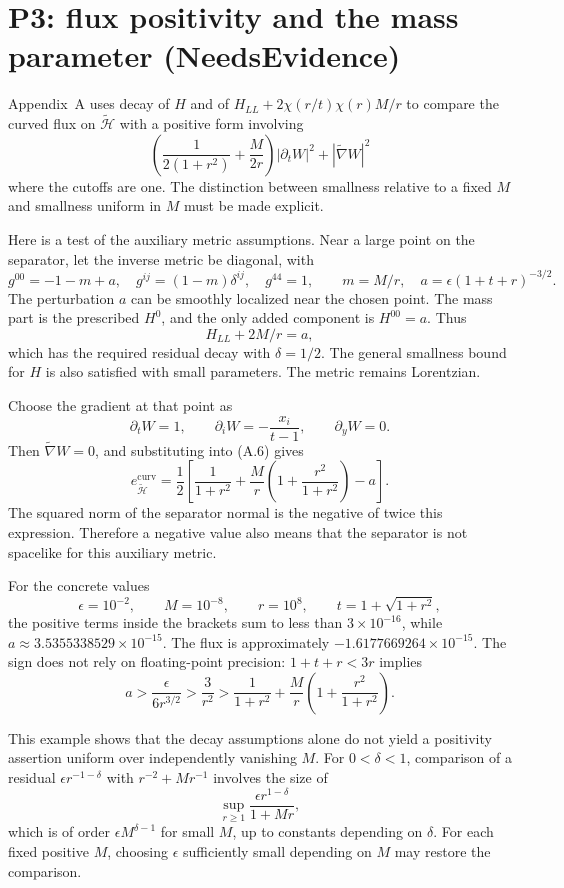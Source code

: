 \documentclass[10pt]{article}
\begin{document}
\section*{P3: flux positivity and the mass parameter (NeedsEvidence)}
Appendix A uses decay of \(H\) and of \(H_{LL}+2\chi(r/t)\chi(r)M/r\) to compare the curved flux on \(\widetilde{\mathcal H}\) with a positive form involving \[\left(\frac{1}{2(1+r^2)}+\frac{M}{2r}\right)|\partial_tW|^2
       +|\widetilde\nabla W|^2\] where the cutoffs are one. The distinction between smallness relative to a fixed \(M\) and smallness uniform in \(M\) must be made explicit.\par
Here is a test of the auxiliary metric assumptions. Near a large point on the separator, let the inverse metric be diagonal, with \[g^{00}=-1-m+a,\quad g^{ij}=(1-m)\delta^{ij},\quad g^{44}=1,
 \qquad m=M/r,\quad a=\epsilon(1+t+r)^{-3/2}.\] The perturbation \(a\) can be smoothly localized near the chosen point. The mass part is the prescribed \(H^0\), and the only added component is \(H^{00}=a\). Thus \[H_{LL}+2M/r=a,\] which has the required residual decay with \(\delta=1/2\). The general smallness bound for \(H\) is also satisfied with small parameters. The metric remains Lorentzian.\par
Choose the gradient at that point as \[\partial_tW=1,\qquad
 \partial_iW=-\frac{x_i}{t-1},\qquad \partial_yW=0.\] Then \(\widetilde\nabla W=0\), and substituting into (A.6) gives \[e^{\mathrm{curv}}_{\widetilde{\mathcal H}}
 =\frac12\left[
 \frac{1}{1+r^2}
 +\frac{M}{r}\left(1+\frac{r^2}{1+r^2}\right)-a\right].\] The squared norm of the separator normal is the negative of twice this expression. Therefore a negative value also means that the separator is not spacelike for this auxiliary metric.\par
For the concrete values \[\epsilon=10^{-2},\qquad M=10^{-8},\qquad r=10^8,
 \qquad t=1+\sqrt{1+r^2},\] the positive terms inside the brackets sum to less than \(3\times10^{-16}\), while \(a\approx3.5355338529\times10^{-15}\). The flux is approximately \(-1.6177669264\times10^{-15}\). The sign does not rely on floating-point precision: \(1+t+r<3r\) implies \[a>\frac{\epsilon}{6r^{3/2}}
   >\frac{3}{r^2}
   >\frac{1}{1+r^2}
      +\frac{M}{r}\left(1+\frac{r^2}{1+r^2}\right).\]\par
This example shows that the decay assumptions alone do not yield a positivity assertion uniform over independently vanishing \(M\). For \(0<\delta<1\), comparison of a residual \(\epsilon r^{-1-\delta}\) with \(r^{-2}+Mr^{-1}\) involves the size of \[\sup_{r\geq1}\frac{\epsilon r^{1-\delta}}{1+Mr},\] which is of order \(\epsilon M^{\delta-1}\) for small \(M\), up to constants depending on \(\delta\). For each fixed positive \(M\), choosing \(\epsilon\) sufficiently small depending on \(M\) may restore the comparison.\par
\end{document}
